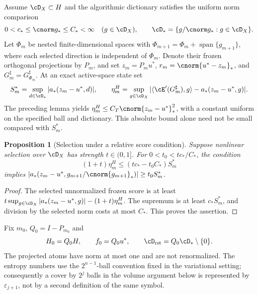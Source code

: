 \documentclass[11pt]{article}
\newtheorem{proposition}[theorem]{Proposition}
\theoremstyle{remark}
\begin{document}
Assume $\cD_X\subset H$ and the algorithmic dictionary satisfies the uniform norm comparison
\begin{equation}
 0<c_*\leq\cnorm g_*\leq C_*<\infty\quad(g\in\cD_X),\qquad
 \cD_*=\{g/\cnorm g_*:g\in\cD_X\}.
 \label{eq:c5-bridge}
\end{equation}
Let $\Phi_m$ be nested finite-dimensional spaces with
$\Phi_{m+1}=\Phi_m+\operatorname{span}\{g_{m+1}\}$, where each selected
direction is independent of $\Phi_m$. Denote their frozen orthogonal
projections by $P_m$, and set $z_m=P_mu^*$,
$r_m=\cnorm{u^*-z_m}_*$, and
$G_m^\sharp=G_{\Phi_m}^\sharp$.
At an exact active-space state set
\[
 S_m^*=\sup_{d\in\cD_*}|a_*(z_m-u^*,d)|,\qquad
 \eta_m^H=\sup_{g\in\cD_X}
 |\langle\cE'(G_m^\sharp),g\rangle-a_*(z_m-u^*,g)|.
\]
The preceding lemma yields
$\eta_m^H\leq C_T\cnorm{z_m-u^*}_*^2$, with a constant uniform on the
specified ball and dictionary. This absolute bound alone need not be
small compared with $S_m^*$.

\begin{proposition}[Selection under a relative score condition]
\label{prop:c5-transfer}
Suppose nonlinear selection over $\cD_X$ has strength $t\in(0,1]$.
For $0<t_0<tc_*/C_*$, the condition
\begin{equation}
 (1+t)\eta_m^H\leq(tc_*-t_0C_*)S_m^*
 \label{eq:c5-relative}
\end{equation}
implies
$|a_*(z_m-u^*,g_{m+1}/\cnorm{g_{m+1}}_*)|\geq t_0S_m^*$.
\end{proposition}
\begin{proof}
The selected unnormalized frozen score is at least
$t\sup_{g\in\cD_X}|a_*(z_m-u^*,g)|-(1+t)\eta_m^H$.
The supremum is at least $c_*S_m^*$, and division by the selected
norm costs at most $C_*$. This proves the assertion.
\end{proof}

Fix $m_0$, $Q_0=I-P_{m_0}$ and
\[
 H_0=Q_0H,\qquad f_0=Q_0u^*,\qquad
 \cD_{\rm rst}=Q_0\cD_*\setminus\{0\}.
\]
The projected atoms have norm at most one and are not renormalized.
The entropy numbers use the \(2^{n-1}\)-ball convention fixed in
the variational setting; consequently a cover by \(2^j\) balls in the
volume argument below is represented by \(\varepsilon_{j+1}\), not by a
second definition of the same symbol.
\end{document}
